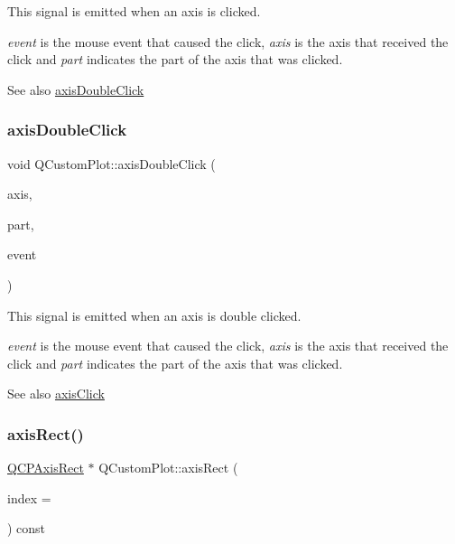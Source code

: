 This signal is emitted when an axis is clicked.

{\itshape event} is the mouse event that caused the click, {\itshape axis} is the axis that received the click and {\itshape part} indicates the part of the axis that was clicked.

\begin{DoxySeeAlso}{See also}
\hyperlink{class_q_custom_plot_a6df35357460181a72da3e93d600f5256}{axis\+Double\+Click} 
\end{DoxySeeAlso}
\mbox{\label{class_q_custom_plot_a6df35357460181a72da3e93d600f5256}} 
\subsubsection{\texorpdfstring{axis\+Double\+Click}{axisDoubleClick}}
{\footnotesize\ttfamily void Q\+Custom\+Plot\+::axis\+Double\+Click (\begin{DoxyParamCaption}\item[{\hyperlink{class_q_c_p_axis}{Q\+C\+P\+Axis} $\ast$}]{axis,  }\item[{\hyperlink{class_q_c_p_axis_abee4c7a54c468b1385dfce2c898b115f}{Q\+C\+P\+Axis\+::\+Selectable\+Part}}]{part,  }\item[{Q\+Mouse\+Event $\ast$}]{event }\end{DoxyParamCaption})\hspace{0.3cm}{\ttfamily [signal]}}

This signal is emitted when an axis is double clicked.

{\itshape event} is the mouse event that caused the click, {\itshape axis} is the axis that received the click and {\itshape part} indicates the part of the axis that was clicked.

\begin{DoxySeeAlso}{See also}
\hyperlink{class_q_custom_plot_abf635f8b56ab5c16d5de9f358543e82b}{axis\+Click} 
\end{DoxySeeAlso}
\mbox{\label{class_q_custom_plot_ae5eefcb5f6ca26689b1fd4f6e25b42f9}} 
\subsubsection{\texorpdfstring{axis\+Rect()}{axisRect()}}
{\footnotesize\ttfamily \hyperlink{class_q_c_p_axis_rect}{Q\+C\+P\+Axis\+Rect} $\ast$ Q\+Custom\+Plot\+::axis\+Rect (\begin{DoxyParamCaption}\item[{int}]{index = {} }\end{DoxyParamCaption}) const}

